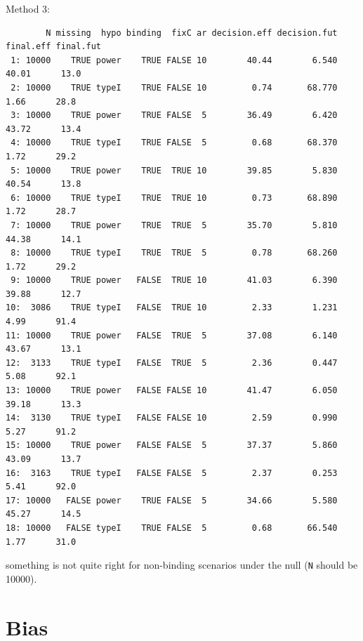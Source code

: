 \documentclass[12pt]{article}
\newcommand\Warning[1][3ex]{%
\renewcommand\stacktype{L}%
\scaleto{\stackon[1.3pt]{\color{red}$\triangle$}{\tiny\bfseries !}}{#1}%
\xspace
}
\begin{document}
Method 3:
\begin{verbatim}
        N missing  hypo binding  fixC ar decision.eff decision.fut final.eff final.fut
 1: 10000    TRUE power    TRUE FALSE 10        40.44        6.540     40.01      13.0
 2: 10000    TRUE typeI    TRUE FALSE 10         0.74       68.770      1.66      28.8
 3: 10000    TRUE power    TRUE FALSE  5        36.49        6.420     43.72      13.4
 4: 10000    TRUE typeI    TRUE FALSE  5         0.68       68.370      1.72      29.2
 5: 10000    TRUE power    TRUE  TRUE 10        39.85        5.830     40.54      13.8
 6: 10000    TRUE typeI    TRUE  TRUE 10         0.73       68.890      1.72      28.7
 7: 10000    TRUE power    TRUE  TRUE  5        35.70        5.810     44.38      14.1
 8: 10000    TRUE typeI    TRUE  TRUE  5         0.78       68.260      1.72      29.2
 9: 10000    TRUE power   FALSE  TRUE 10        41.03        6.390     39.88      12.7
10:  3086    TRUE typeI   FALSE  TRUE 10         2.33        1.231      4.99      91.4
11: 10000    TRUE power   FALSE  TRUE  5        37.08        6.140     43.67      13.1
12:  3133    TRUE typeI   FALSE  TRUE  5         2.36        0.447      5.08      92.1
13: 10000    TRUE power   FALSE FALSE 10        41.47        6.050     39.18      13.3
14:  3130    TRUE typeI   FALSE FALSE 10         2.59        0.990      5.27      91.2
15: 10000    TRUE power   FALSE FALSE  5        37.37        5.860     43.09      13.7
16:  3163    TRUE typeI   FALSE FALSE  5         2.37        0.253      5.41      92.0
17: 10000   FALSE power    TRUE FALSE  5        34.66        5.580     45.27      14.5
18: 10000   FALSE typeI    TRUE FALSE  5         0.68       66.540      1.77      31.0
\end{verbatim}
\Warning something is not quite right for non-binding scenarios under the null (\texttt{N} should be 10000).

\clearpage

\section{Bias}
\label{sec:orgfa2b78e}
\end{document}
